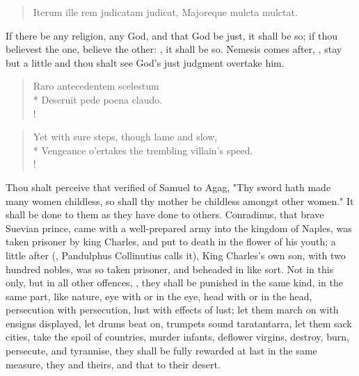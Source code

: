 {%
\begin{latin}%
\begin{verse}%
Iterum ille rem judicatam judicat,
Majoreque mulcta mulctat.
\end{verse}%
\end{latin}%

If there be any religion, any God, and that God be just, it shall be so; if thou believest the one, believe the other: , it shall be so. Nemesis comes after, , stay but a little and thou shalt see God's just judgment overtake him.

%
\begin{latin}%
\begin{verse}%
Raro antecedentem scelestum\\*
Deseruit pede poena claudo.\\!
\end{verse}
\end{latin}
\translationrule%
\begin{verse}%
Yet with sure steps, though lame and slow,\\*
Vengeance o'ertakes the trembling villain's speed.\\!
\end{verse}%

Thou shalt perceive that verified of Samuel to Agag,  "Thy sword hath made many women childless, so shall thy mother be childless amongst other women." It shall be done to them as they have done to others. Conradinus, that brave Suevian prince, came with a well-prepared army into the kingdom of Naples, was taken prisoner by king Charles, and put to death in the flower of his youth; a little after (, Pandulphus Collinutius  calls it), King Charles's own son, with two hundred nobles, was so taken prisoner, and beheaded in like sort. Not in this only, but in all other offences, , they shall be punished in the same kind, in the same part, like nature, eye with or in the eye, head with or in the head, persecution with persecution, lust with effects of lust; let them march on with ensigns displayed, let drums beat on, trumpets sound taratantarra, let them sack cities, take the spoil of countries, murder infants, deflower virgins, destroy, burn, persecute, and tyrannise, they shall be fully rewarded at last in the same measure, they and theirs, and that to their desert.

}
